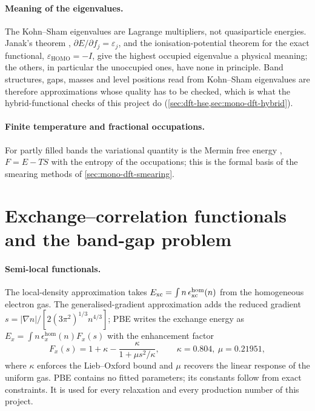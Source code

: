 \paragraph{Meaning of the eigenvalues.} The Kohn--Sham eigenvalues are Lagrange multipliers, not quasiparticle
energies. Janak's theorem \citep{Janak1978}, $\partial E/\partial f_j = \varepsilon_j$, and the ionisation-potential
theorem for the exact functional, $\varepsilon_{\mathrm{HOMO}} = -I$, give the highest occupied eigenvalue a physical
meaning; the others, in particular the unoccupied ones, have none in principle. Band structures, gaps, masses and
level positions read from Kohn--Sham eigenvalues are therefore approximations whose quality has to be checked, which is
what the hybrid-functional checks of this project do (\cref{sec:dft-hse,sec:mono-dft-hybrid}).

\paragraph{Finite temperature and fractional occupations.} For partly filled bands the variational quantity is the
Mermin free energy \citep{Mermin1965}, $F = E - TS$ with the entropy of the occupations; this is the formal basis of
the smearing methods of \cref{sec:mono-dft-smearing}.

\section{Exchange--correlation functionals and the band-gap problem}
\label{sec:mono-dft-xc}

\paragraph{Semi-local functionals.} The local-density approximation takes $E_{\mathrm{xc}} = \int n\,\epsilon_{\mathrm{xc}}^{\mathrm{hom}}(n)$
from the homogeneous electron gas. The generalised-gradient approximation adds the reduced gradient $s =
|\nabla n|/[2(3\pi^2)^{1/3}n^{4/3}]$; PBE \citep{Perdew1996} writes the exchange energy as $E_x = \int n\,
\epsilon_x^{\mathrm{hom}}(n)F_x(s)$ with the enhancement factor
\begin{equation}
F_x(s) = 1 + \kappa - \frac{\kappa}{1+\mu s^2/\kappa}, \qquad \kappa = 0.804,\ \mu = 0.21951 ,
\label{eq:mono-dft-pbe}
\end{equation}
where $\kappa$ enforces the Lieb--Oxford bound and $\mu$ recovers the linear response of the uniform gas. PBE
contains no fitted parameters; its constants follow from exact constraints. It is used for every relaxation and every
production number of this project.

